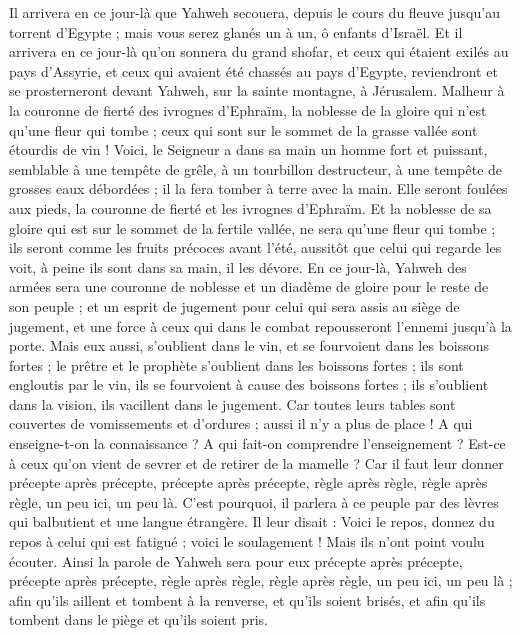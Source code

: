 \begin{multicols}{2}
Il arrivera en ce jour-là que Yahweh secouera, depuis le cours du fleuve jusqu'au torrent d'Egypte ; mais vous serez glanés un à un, ô enfants d'Israël.
Et il arrivera en ce jour-là qu'on sonnera du grand shofar, et ceux qui étaient exilés au pays d'Assyrie, et ceux qui avaient été chassés au pays d'Egypte, reviendront et se prosterneront devant Yahweh, sur la sainte montagne, à Jérusalem.
\VerseOne{}Malheur à la couronne de fierté des ivrognes d'Ephraïm, la noblesse de la gloire qui n'est qu'une fleur qui tombe ; ceux qui sont sur le sommet de la grasse vallée sont étourdis de vin !
Voici, le Seigneur a dans sa main un homme fort et puissant, semblable à une tempête de grêle, à un tourbillon destructeur, à une tempête de grosses eaux débordées ; il la fera tomber à terre avec la main.
Elle seront foulées aux pieds, la couronne de fierté et les ivrognes d'Ephraïm.
Et la noblesse de sa gloire qui est sur le sommet de la fertile vallée, ne sera qu'une fleur qui tombe ; ils seront comme les fruits précoces avant l'été, aussitôt que celui qui regarde les voit, à peine ils sont dans sa main, il les dévore. 
En ce jour-là, Yahweh des armées sera une couronne de noblesse et un diadème de gloire pour le reste de son peuple ;
et un esprit de jugement pour celui qui sera assis au siège de jugement, et une force à ceux qui dans le combat repousseront l'ennemi jusqu'à la porte.
Mais eux aussi, s'oublient dans le vin, et se fourvoient dans les boissons fortes ; le prêtre et le prophète s'oublient dans les boissons fortes ; ils sont engloutis par le vin, ils se fourvoient à cause des boissons fortes ; ils s'oublient dans la vision, ils vacillent dans le jugement.
Car toutes leurs tables sont couvertes de vomissements et d'ordures ; aussi il n'y a plus de place !
A qui enseigne-t-on la connaissance ? A qui fait-on comprendre l'enseignement ? Est-ce à ceux qu'on vient de sevrer et de retirer de la mamelle ?
Car il faut leur donner précepte après précepte, précepte après précepte, règle après règle, règle après règle, un peu ici, un peu là.
C'est pourquoi, il parlera à ce peuple par des lèvres qui balbutient et une langue étrangère.
Il leur disait : Voici le repos, donnez du repos à celui qui est fatigué ; voici le soulagement ! Mais ils n'ont point voulu écouter.
Ainsi la parole de Yahweh sera pour eux précepte après précepte, précepte après précepte, règle après règle, règle après règle, un peu ici, un peu là ; afin qu'ils aillent et tombent à la renverse, et qu'ils soient brisés, et afin qu'ils tombent dans le piège et qu'ils soient pris.

\end{multicols}
